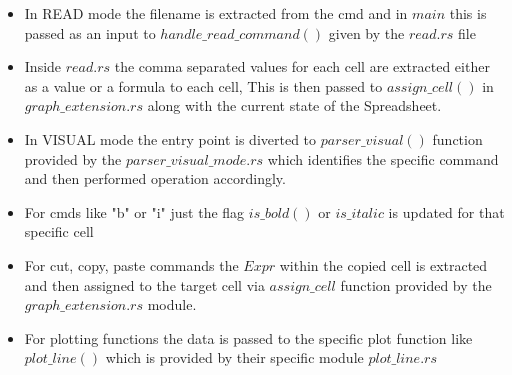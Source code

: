 \documentclass{article}
\begin{document}
\begin{itemize}
\begin{itemize}
\item In READ mode the filename is extracted from the cmd and in $main$ this is passed as an input to $handle\_read\_command()$ given by the $read.rs$ file
\item Inside $read.rs$ the comma separated values for each cell are extracted either as a value or a formula to each cell, This is then passed to $assign\_cell()$ in $graph\_extension.rs$ along with the current state of the Spreadsheet.
\item In VISUAL mode the entry point is diverted to $parser\_visual()$ function provided by the $parser\_visual\_mode.rs$ which identifies the specific command and then performed operation accordingly.
\item For cmds like "b" or "i" just the flag $is\_bold()$ or $is\_italic$ is updated for that specific cell
\item For cut, copy, paste commands the $Expr$ within the copied cell is extracted and then assigned to the target cell via $assign\_cell$ function provided by the $graph\_extension.rs$ module.
\item For plotting functions the data is passed to the specific plot function like $plot\_line()$ which is provided by their specific module $plot\_line.rs$
\end{itemize}


\end{itemize}
\end{document}
